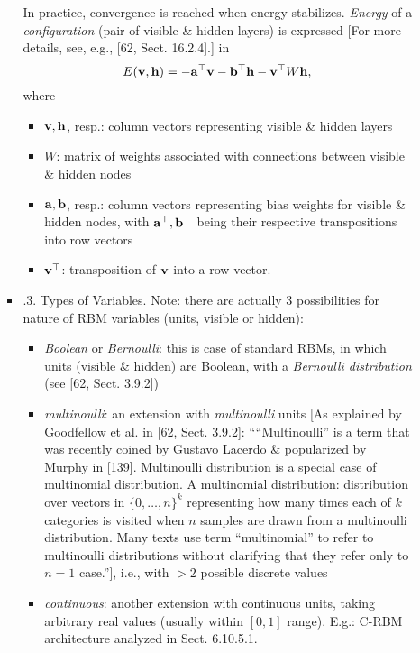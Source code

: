 \documentclass{article}
\begin{document}
\begin{itemize}
\begin{itemize}
\begin{itemize}
			In practice, convergence is reached when energy stabilizes. {\it Energy} of a {\it configuration} (pair of visible \& hidden layers) is expressed [For more details, see, e.g., [62, Sect. 16.2.4].] in
			\begin{equation*}
				E({\bf v},{\bf h}) = -{\bf a}^\top{\bf v} - {\bf b}^\top{\bf h} - {\bf v}^\top W{\bf h},
			\end{equation*}
			where
			\begin{itemize}
				\item ${\bf v},{\bf h}$, resp.: column vectors representing visible \& hidden layers
				\item $W$: matrix of weights associated with connections between visible \& hidden nodes
				\item ${\bf a},{\bf b}$, resp.: column vectors representing bias weights for visible \& hidden nodes, with ${\bf a}^\top,{\bf b}^\top$ being their respective transpositions into row vectors
				\item ${\bf v}^\top$: transposition of ${\bf v}$ into a row vector.
			\end{itemize}			
			\item {.3. Types of Variables.} Note: there are actually 3 possibilities for nature of RBM variables (units, visible or hidden):
			\begin{itemize}
				\item {\it Boolean} or {\it Bernoulli}: this is case of standard RBMs, in which units (visible \& hidden) are Boolean, with a {\it Bernoulli distribution} (see [62, Sect. 3.9.2])
				\item {\it multinoulli}: an extension with {\it multinoulli} units [As explained by Goodfellow et al. in [62, Sect. 3.9.2]: ````Multinoulli'' is a term that was recently coined by {\sc Gustavo Lacerdo} \& popularized by {\sc Murphy} in [139]. Multinoulli distribution is a special case of multinomial distribution. A multinomial distribution: distribution over vectors in $\{0,\ldots,n\}^k$ representing how many times each of $k$ categories is visited when $n$ samples are drawn from a multinoulli distribution. Many texts use term ``multinomial'' to refer to multinoulli distributions without clarifying that they refer only to $n = 1$ case.''], i.e., with $> 2$ possible discrete values
				\item {\it continuous}: another extension with continuous units, taking arbitrary real values (usually within $[0,1]$ range). E.g.: C-RBM architecture analyzed in Sect. 6.10.5.1.
			\end{itemize}

\end{itemize}
\end{itemize}
\end{itemize}
\end{document}
